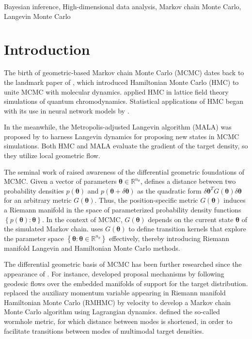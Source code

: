 \documentclass[twoside,11pt]{article}
\begin{document}
\begin{keywords}
  Bayesian inference,
  High-dimensional data analysis,
  Markov chain Monte Carlo,
  Langevin Monte Carlo	
\end{keywords}

\section{Introduction}

The birth of geometric-based Markov chain Monte Carlo (MCMC) dates back to the landmark paper of \cite{dua_ken_pen__hyb},
which introduced Hamiltonian Monte Carlo (HMC) to unite MCMC with molecular dynamics.
\cite{dua_ken_pen__hyb} applied HMC in lattice field theory simulations of quantum chromodynamics.
Statistical applications of HMC began with its use in neural network models by \cite{nea__bay}.

In the meanwhile, the Metropolis-adjusted Langevin algorithm (MALA) was proposed by \cite{rob_ros__opt} to harness Langevin 
dynamics for proposing new states in MCMC simulations. Both HMC and MALA evaluate the gradient of the target density, so 
they utilize local geometric flow.

The seminal work of \cite{gir_cal__rie} raised awareness of the differential geometric foundations of MCMC. Given a vector 
of parameters $\boldsymbol{\theta}\in\mathbb{R}^{n_\theta}$, \cite{gir_cal__rie} defines a distance between two probability 
densities $p(\boldsymbol{\theta})$ and $p(\boldsymbol{\theta}+\delta\boldsymbol{\theta})$ as the quadratic form
$\delta\boldsymbol{\theta}^T G(\boldsymbol{\theta}) \delta\boldsymbol{\theta}$ for an arbitrary metric 
$G(\boldsymbol{\theta})$. Thus, the position-specific metric $G(\boldsymbol{\theta})$ induces a Riemann manifold in the 
space of parameterized probability density functions $\left\{p(\boldsymbol{\theta}):\boldsymbol{\theta}\right\}$.
In the context of MCMC, $G(\boldsymbol{\theta})$ depends on the current state $\boldsymbol{\theta}$ of the simulated Markov 
chain. \cite{gir_cal__rie} uses $G(\boldsymbol{\theta})$ to define transition kernels that explore the parameter space
$\left\{\boldsymbol{\theta}:\boldsymbol{\theta}\in\mathbb{R}^{n_\theta}\right\}$ effectively, thereby introducing Riemann 
manifold Langevin and Hamiltonian Monte Carlo methods.

The differential geometric basis of MCMC has been further researched since the appearance of \cite{gir_cal__rie}. For 
instance, \cite{byr_gir__geo} developed proposal mechanisms by following geodesic flows over the embedded manifolds of 
support for the target distribution. \cite{lan_sta_sha__mar} replaced the auxiliary momentum variable appearing in Riemann 
manifold Hamiltonian Monte Carlo (RMHMC) by velocity to develop a Markov chain Monte Carlo algorithm using Lagrangian 
dynamics. \cite{lan_str_sha__wor} defined the so-called wormhole metric, for which distance between modes is shortened, in 
order to facilitate transitions between modes of multimodal target densities.
\end{document}
